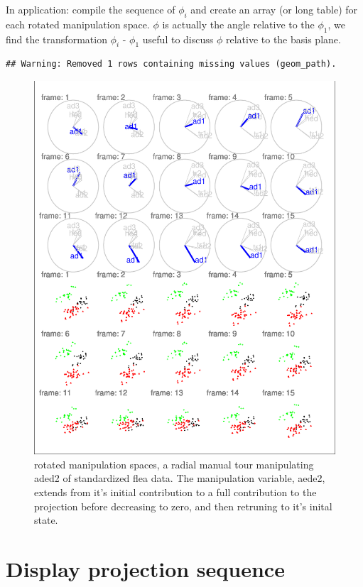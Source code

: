 \documentclass{monashthesis}
\begin{document}
In application: compile the sequence of \(\phi_i\) and create an array (or long table) for each rotated manipulation space. \(\phi\) is actually the angle relative to the \(\phi_1\), we find the transformation \(\phi_i\) - \(\phi_1\) useful to discuss \(\phi\) relative to the basis plane.

\begin{verbatim}
## Warning: Removed 1 rows containing missing values (geom_path).
\end{verbatim}

\begin{figure}
\centering
\includegraphics{thesis_files/figure-latex/step3-1.pdf}
\caption{\label{fig:step3}rotated manipulation spaces, a radial manual tour manipulating aded2 of standardized flea data. The manipulation variable, aede2, extends from it's initial contribution to a full contribution to the projection before decreasing to zero, and then retruning to it's inital state.}
\end{figure}

\hypertarget{display-projection-sequence}{%
\section{Display projection sequence}\label{display-projection-sequence}}
\end{document}
